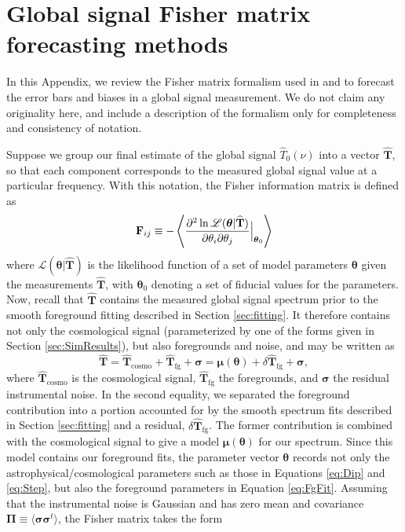 \documentclass[twocolumn,apj,numberedappendix]{emulateapj}
\newcommand{\F}{\mathbf{F}}
\newcommand{\mep}[1]{}
\begin{document}
\section{Global signal Fisher matrix forecasting methods}
\label{fisher}
In this Appendix, we review the Fisher matrix formalism used in \citet{PritchardLoeb2010} and \citet{BernardiLEDA} \mep{Added citation} to forecast the error bars and biases in a global signal measurement. We do not claim any originality here, and include a description of the formalism only for completeness and consistency of notation.

Suppose we group our final estimate of the global signal $\widehat{T}_0 (\nu)$ into a vector $\widehat{\mathbf{T}}$, so that each component corresponds to the measured global signal value at a particular frequency. With this notation, the Fisher information matrix is defined as
\begin{equation}
\F_{ij} \equiv -\left \langle \frac{\partial^2 \ln \mathscr{L}(\boldsymbol \theta | \widehat{\mathbf{T}})}{\partial \theta_i \partial \theta_j} \Big{|}_{\boldsymbol \theta_0} \right \rangle
\end{equation}
where $\mathscr{L}(\boldsymbol \theta | \widehat{\mathbf{T}})$ is the likelihood function of a set of model parameters $\boldsymbol \theta$ given the measurements $\widehat{\mathbf{T}}$, with $\boldsymbol \theta_0$ denoting a set of fiducial values for the parameters. Now, recall that $\widehat{\mathbf{T}}$ contains the measured global signal spectrum prior to the smooth foreground fitting described in Section \ref{sec:fitting}. It therefore contains not only the cosmological signal (parameterized by one of the forms given in Section \ref{sec:SimResults}), but also foregrounds and noise, and may be written as
\begin{equation}
\widehat{\mathbf{T}}= \widehat{\mathbf{T}} _\textrm{cosmo} + \widehat{\mathbf{T}}_\textrm{fg} + \boldsymbol \sigma = \boldsymbol \mu (\boldsymbol \theta) +\delta \widehat{\mathbf{T}}_\textrm{fg} + \boldsymbol \sigma,
\end{equation}
where $\widehat{\mathbf{T}} _\textrm{cosmo}$ is the cosmological signal, $\widehat{\mathbf{T}}_\textrm{fg}$ the foregrounds, and $\boldsymbol \sigma$ the residual instrumental noise. In the second equality, we separated the foreground contribution into a portion accounted for by the smooth spectrum fits described in Section \ref{sec:fitting} and a residual, $\delta \widehat{\mathbf{T}}_\textrm{fg}$. The former contribution is combined with the cosmological signal to give a model $\boldsymbol \mu (\boldsymbol \theta)$ for our spectrum. Since this model contains our foreground fits, the parameter vector $\boldsymbol \theta$ records not only the astrophysical/cosmological parameters such as those in Equations \eqref{eq:Dip} and \eqref{eq:Step}, but also the foreground parameters in Equation \eqref{eq:FgFit}. Assuming that the instrumental noise is Gaussian and has zero mean and covariance $\boldsymbol \Pi \equiv \langle \boldsymbol \sigma \boldsymbol \sigma^t \rangle$, the Fisher matrix takes the form
\end{document}
